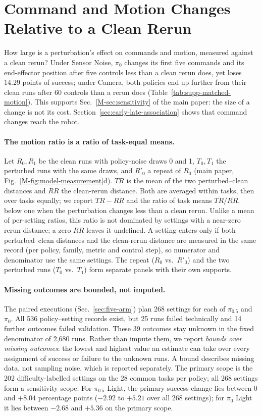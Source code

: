 \section{Command and Motion Changes Relative to a Clean Rerun}
\label{sec:supp-matched-motion}
How large is a perturbation's effect on commands and motion, measured against a clean rerun? Under Sensor Noise, $\pi_0$ changes its first five commands and its end-effector position after five controls less than a clean rerun does, yet loses 14.29 points of success; under Camera, both policies end up further from their clean runs after 60 controls than a rerun does (Table~\ref{tab:supp-matched-motion}). This supports Sec.~\ref*{M-sec:sensitivity} of the main paper: the size of a change is not its cost. Section~\ref{sec:early-late-association} shows that command changes reach the robot.

\paragraph{The motion ratio is a ratio of task-equal means.}
Let $R_0,R_1$ be the clean runs with policy-noise draws 0 and 1, $T_0,T_1$ the perturbed runs with the same draws, and $R'_0$ a repeat of $R_0$ (main paper, Fig.~\ref*{M-fig:model-measurement}d). $TR$ is the mean of the two perturbed--clean distances and $RR$ the clean-rerun distance. Both are averaged within tasks, then over tasks equally; we report $TR-RR$ and the ratio of task means $\overline{TR}/\overline{RR}$, below one when the perturbation changes less than a clean rerun. Unlike a mean of per-setting ratios, this ratio is not dominated by settings with a near-zero rerun distance; a zero $RR$ leaves it undefined. A setting enters only if both perturbed--clean distances and the clean-rerun distance are measured in the same record (per policy, family, metric and control step), so numerator and denominator use the same settings. The repeat ($R_0$ vs.\ $R'_0$) and the two perturbed runs ($T_0$ vs.\ $T_1$) form separate panels with their own supports.

\paragraph{Missing outcomes are bounded, not imputed.}
The paired executions (Sec.~\ref{sec:five-arm}) plan 268 settings for each of $\pi_{0.5}$ and $\pi_0$. All 536 policy--setting records exist, but 25 runs failed technically and 14 further outcomes failed validation. These 39 outcomes stay unknown in the fixed denominator of 2,680 runs. Rather than impute them, we report \emph{bounds over missing outcomes}: the lowest and highest value an estimate can take over every assignment of success or failure to the unknown runs. A bound describes missing data, not sampling noise, which is reported separately. The primary scope is the 202 difficulty-labelled settings on the 28 common tasks per policy; all 268 settings form a sensitivity scope. For $\pi_{0.5}$ Light, the primary success change lies between 0 and $+8.04$ percentage points ($-2.92$ to $+5.21$ over all 268 settings); for $\pi_0$ Light it lies between $-2.68$ and $+5.36$ on the primary scope.

